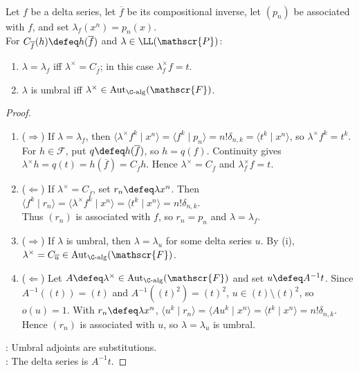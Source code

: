 \begin{theorem} \label{thm:umbral-operators-automorphisms-composition} \\
Let $f$ be a delta series, let $\overline f$ be its compositional inverse, let $(p_n)$ be associated with $f$, and set $\lambda_f(x^n)=p_n(x)$.\\
For $C_{\overline f}(h)\defeq h(\overline f)$ and $\lambda\in\LL(\mathscr{P})$:
\begin{enumerate}[label=(\roman*)]
\setlength{\itemsep}{0pt}
\item $\lambda=\lambda_f$ iff $\lambda^\times=C_{\overline f}$; in this case $\lambda_f^\times f=t$.
\item $\lambda$ is umbral iff $\lambda^\times\in\operatorname{Aut}_{\C\text{-alg}}(\mathscr{F})$.
\end{enumerate}
\begin{proof}
\begin{enumerate}[label=(\roman*)]
\setlength{\itemsep}{0pt}
\item[$(i)$] ($\Rightarrow$) If $\lambda=\lambda_f$, then $\langle\lambda^\times f^k\mid x^n\rangle=\langle f^k\mid p_n\rangle=n!\delta_{n,k}=\langle t^k\mid x^n\rangle$, so $\lambda^\times f^k=t^k$. For $h\in\mathscr{F}$, put $q\defeq h(\overline f)$, so $h=q(f)$. Continuity gives $\lambda^\times h=q(t)=h(\overline f)=C_{\overline f}h$. Hence $\lambda^\times=C_{\overline f}$ and $\lambda_f^\times f=t$.
\item[$(i)$] ($\Leftarrow$) If $\lambda^\times=C_{\overline f}$, set $r_n\defeq\lambda x^n$. Then $\langle f^k\mid r_n\rangle=\langle\lambda^\times f^k\mid x^n\rangle=\langle t^k\mid x^n\rangle=n!\delta_{n,k}$.\\
Thus $(r_n)$ is associated with $f$, so $r_n=p_n$ and $\lambda=\lambda_f$.
\item[$(ii)$] ($\Rightarrow$) If $\lambda$ is umbral, then $\lambda=\lambda_u$ for some delta series $u$. By (i), $\lambda^\times=C_{\overline u}\in\operatorname{Aut}_{\C\text{-alg}}(\mathscr{F})$.
\item[$(ii)$] ($\Leftarrow$) Let $A\defeq\lambda^\times\in\operatorname{Aut}_{\C\text{-alg}}(\mathscr{F})$ and set $u\defeq A^{-1}t$. Since $A^{-1}((t))=(t)$ and $A^{-1}((t)^2)=(t)^2$, $u\in(t)\setminus(t)^2$, so $o(u)=1$. With $r_n\defeq\lambda x^n$, $\langle u^k\mid r_n\rangle=\langle Au^k\mid x^n\rangle=\langle t^k\mid x^n\rangle=n!\delta_{n,k}$.\\
Hence $(r_n)$ is associated with $u$, so $\lambda=\lambda_u$ is umbral.
\end{enumerate}
: Umbral adjoints are substitutions.\\
: The delta series is $A^{-1}t$.
\end{proof}
\end{theorem}

